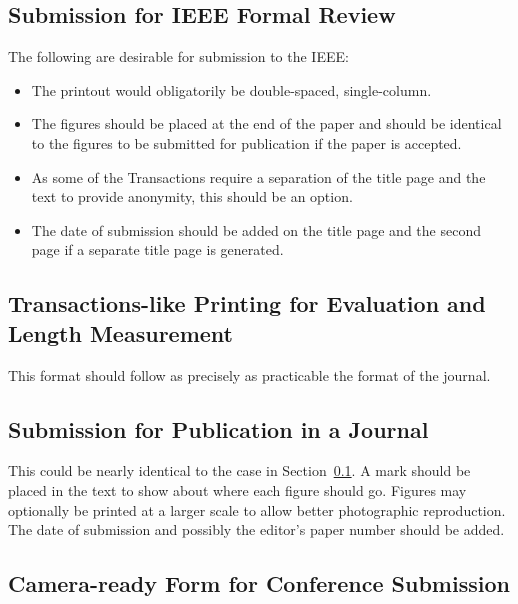 \documentclass[%
	final,
	reprint,
	notitlepage,
	narroweqnarray,
	inline,
	twoside,
        invited,
	]{ieee}
\begin{document}
\subsection{Submission for IEEE Formal Review}
\label{sec:review}

The following are desirable for submission to the IEEE:
\begin{itemize}
\item The printout would obligatorily be double-spaced, single-column.  
\item The figures should be placed at the end of the paper and should
      be identical to the figures to be submitted for publication if
      the paper is accepted.
\item As some of the Transactions require a separation of the title
      page and the text to provide anonymity, this should be an
      option. 
\item The date of submission should be added on the title page 
      and the second page if a separate title page is generated.
\end{itemize}

\subsection{Transactions-like Printing for Evaluation and Length
Measurement}

This format should follow as precisely as practicable the format of the 
journal.

\subsection{Submission for Publication in a Journal}

This could be nearly identical to the case in
Section~\ref{sec:review}.  A mark should be placed in the text to show
about where each figure should go.  Figures may optionally be printed
at a larger scale to allow better photographic reproduction.  The date
of submission and possibly the editor's paper number should be added.

\subsection{Camera-ready Form for Conference Submission}
\end{document}
